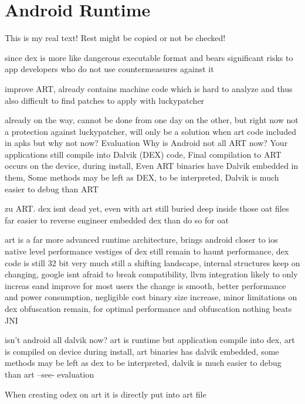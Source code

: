 \section{Android Runtime} \label{section:counter-external-art}
This is my real text! Rest might be copied or not be checked!

since dex is more like dangerous executable format and bears significant risks to app developers who do not use countermeasures against it

improve ART, already contains machine code which is hard to analyze and thus also difficult to find patches to apply with luckypatcher



already on the way, cannot be done from one day on the other, but right now not a protection against luckypatcher, will only be a solution when art code included in apks
but why not now?
%
Evaluation
Why is Android not all ART now? Your applications still compile into Dalvik (DEX) code, Final compilation to ART occurs on the device, during install, Even ART binaries have Dalvik embedded in them, Some methods may be left as DEX, to be interpreted, Dalvik is much easier to debug than ART\newline
\cite{andevconDalvikART}
%

%
zu ART.
dex isnt dead yet, even with art
still buried deep inside those oat files
far easier to reverse engineer embedded dex than do so for oat

art is a far more advanced runtime architecture, brings android closer to ios native level performance
vestiges of dex still remain to haunt performance, dex code is still 32 bit
very much still a shifting landscape, internal structures keep on changing, google isnt afraid to break compatibility, llvm integration likely to only increas eand improve
for most users the change is smooth, better performance and power consumption, negligible cost binary size increase, minor limitations on dex obfuscation remain, for optimal performance and obfuscation nothing beats JNI

isn't android all dalvik now?
art is runtime but application compile into dex, art is compiled on device during install, art binaries has dalvik embedded, some methods may be left as dex to be interpreted, dalvik is much easier to debug than art --see- evaluation \newline

When creating odex on art it is directly put into art file

\cite{andevconDalvikART}
%

